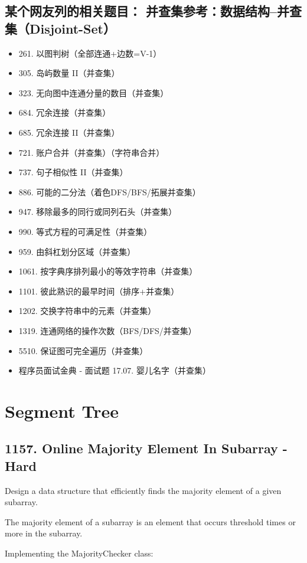\documentclass[9pt, b5paper]{article}
\begin{document}
\subsection{某个网友列的相关题目： 并查集参考：数据结构–并查集（Disjoint-Set）}
\label{sec-11-8}
\begin{itemize}
\item 261. 以图判树（全部连通+边数=V-1）
\item 305. 岛屿数量 II（并查集）
\item 323. 无向图中连通分量的数目（并查集）
\item 684. 冗余连接（并查集）
\item 685. 冗余连接 II（并查集）
\item 721. 账户合并（并查集）（字符串合并）
\item 737. 句子相似性 II（并查集）
\item 886. 可能的二分法（着色DFS/BFS/拓展并查集）
\item 947. 移除最多的同行或同列石头（并查集）
\item 990. 等式方程的可满足性（并查集）
\item 959. 由斜杠划分区域（并查集）
\item 1061. 按字典序排列最小的等效字符串（并查集）
\item 1101. 彼此熟识的最早时间（排序+并查集）
\item 1202. 交换字符串中的元素（并查集）
\item 1319. 连通网络的操作次数（BFS/DFS/并查集）
\item 5510. 保证图可完全遍历（并查集）
\item 程序员面试金典 - 面试题 17.07. 婴儿名字（并查集）
\end{itemize}

\section{Segment Tree}
\label{sec-12}
\subsection{1157. Online Majority Element In Subarray - Hard}
\label{sec-12-1}
Design a data structure that efficiently finds the majority element of a given subarray.

The majority element of a subarray is an element that occurs threshold times or more in the subarray.

Implementing the MajorityChecker class:
\end{document}
